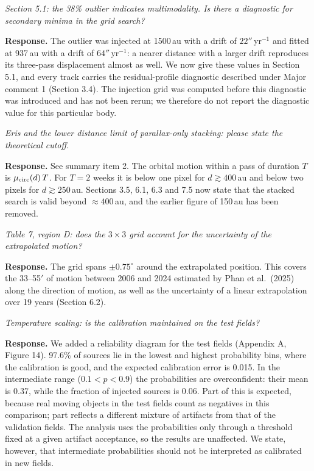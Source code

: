 \documentclass[11pt]{article}
\newenvironment{referee}{\par\color{black!60}\itshape}{\par}
\newcommand{\resp}{\par\noindent\textbf{Response.} }
\begin{document}
\begin{referee}
Section 5.1: the 38\% outlier indicates multimodality. Is there a diagnostic for secondary minima in the grid search?
\end{referee}
\resp The outlier was injected at 1500\,au with a drift of $22''$\,yr$^{-1}$ and fitted at 937\,au with a drift of $64''$\,yr$^{-1}$: a nearer distance with a larger drift reproduces its three-pass displacement almost as well. We now give these values in Section 5.1, and every track carries the residual-profile diagnostic described under Major comment 1 (Section 3.4). The injection grid was computed before this diagnostic was introduced and has not been rerun; we therefore do not report the diagnostic value for this particular body.

\begin{referee}
Eris and the lower distance limit of parallax-only stacking: please state the theoretical cutoff.
\end{referee}
\resp See summary item 2. The orbital motion within a pass of duration $T$ is $\mu_{\rm circ}(d)\,T$. For $T = 2$ weeks it is below one pixel for $d \gtrsim 400$\,au and below two pixels for $d \gtrsim 250$\,au. Sections 3.5, 6.1, 6.3 and 7.5 now state that the stacked search is valid beyond $\approx 400$\,au, and the earlier figure of 150\,au has been removed.

\begin{referee}
Table 7, region D: does the $3\times3$ grid account for the uncertainty of the extrapolated motion?
\end{referee}
\resp The grid spans $\pm0.75^\circ$ around the extrapolated position. This covers the 33--55$'$ of motion between 2006 and 2024 estimated by Phan et al.\ (2025) along the direction of motion, as well as the uncertainty of a linear extrapolation over 19 years (Section 6.2).

\begin{referee}
Temperature scaling: is the calibration maintained on the test fields?
\end{referee}
\resp We added a reliability diagram for the test fields (Appendix A, Figure 14). 97.6\% of sources lie in the lowest and highest probability bins, where the calibration is good, and the expected calibration error is 0.015. In the intermediate range ($0.1 < p < 0.9$) the probabilities are overconfident: their mean is 0.37, while the fraction of injected sources is 0.06. Part of this is expected, because real moving objects in the test fields count as negatives in this comparison; part reflects a different mixture of artifacts from that of the validation fields. The analysis uses the probabilities only through a threshold fixed at a given artifact acceptance, so the results are unaffected. We state, however, that intermediate probabilities should not be interpreted as calibrated in new fields.
\end{document}
